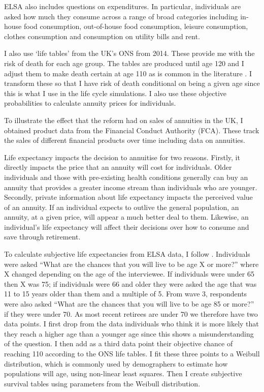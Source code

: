 \documentclass[12pt]{article}
\begin{document}
ELSA also includes questions on expenditures. In particular, individuals are
asked how much they consume across a range of broad categories including
in-house food consumption, out-of-house food consumption, leisure consumption,
clothes consumption and consumption on utility bills and rent.

I also use `life tables' from the UK's ONS from 2014. These provide me with the
risk of death for each age group. The tables are produced until age 120 and I
adjust them to make death certain at age 110 as is common in the literature
\citep{odea_sturrock_rest_2023}. I transform these so that I have risk of death
conditional on being a given age since this is what I use in the life cycle
simulations. I also use these objective probabilities to calculate annuity
prices for individuals.

To illustrate the effect that the reform had on sales of annuities in the UK, I
obtained product data from the Financial Conduct Authority (FCA). These track the
sales of different financial products over time including data on annuities.

Life expectancy impacts the decision to annuitise for two reasons. Firstly, it
directly impacts the price that an annuity will cost for individuals. Older
individuals and those with pre-existing health conditions generally can buy an
annuity that provides a greater income stream than individuals who are younger.
Secondly, private information about life expectancy impacts the perceived value
of an annuity. If an individual expects to outlive the general population, an
annuity, at a given price, will appear a much better deal to them. Likewise, an
individual's life expectancy will affect their decisions over how to consume and
save through retirement.

To calculate subjective life expectancies from ELSA data, I follow
\cite{odea_sturrock_rest_2023}. Individuals were asked “What are the chances
that you will live to be age X or more?” where X changed depending on the age of
the interviewee. If individuals were under 65 then X was 75; if individuals were
66 and older they were asked the age that was 11 to 15 years older than them and
a multiple of 5. From wave 3, respondents were also asked “What are the chances
that you will live to be age 85 or more?” if they were under 70. As most recent
retirees are under 70 we therefore have two data points. I first drop from the
data individuals who think it is more likely that they reach a higher age than a
younger age since this shows a misunderstanding of the question. I then add as a
third data point their objective chance of reaching 110 according to the ONS
life tables. I fit these three points to a Weibull distribution, which is
commonly used by demographers to estimate how populations will age, using
non-linear least squares. Then I create subjective survival tables using
parameters from the Weibull distribution.
\end{document}
